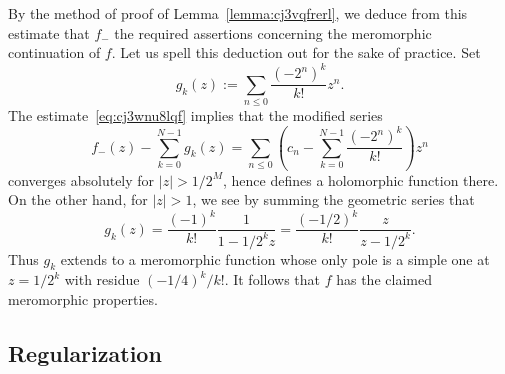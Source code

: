 \documentclass[reqno]{amsart}  \numberwithin{theorem}{section} \numberwithin{equation}{section}
\begin{document}
\begin{example}
\begin{equation}
  \end{equation}
  By the method of proof of Lemma~\ref{lemma:cj3vqfrerl}, we deduce from this estimate that $f_-$ the required assertions concerning the meromorphic continuation of $f$.  Let us spell this deduction out for the sake of practice.  Set
  \begin{equation*}
    g_k(z) := 
    \sum_{n \leq 0}
    \frac{{(-2^n)}^k}{k!} z^n.
  \end{equation*}
  The estimate~\eqref{eq:cj3wnu8lqf} implies that the modified series
  \begin{equation}\label{eq:cj3wnu7518}
    f_-(z)
    -
    \sum_{k = 0}^{N-1}
    g_k(z)
    = 
    \sum_{n \leq 0}
    \left( c_n -
      \sum_{k = 0}^{N-1} \frac{{(-2^n)}^k}{k!}
    \right) z^n
  \end{equation}
  converges absolutely for $\lvert z \rvert > 1 / 2^M$, hence defines a holomorphic function there.  On the other hand, for $\lvert z \rvert > 1$, we see by summing the geometric series that
  \begin{equation*}
    g_k(z)
    =
    \frac{{(-1)}^k}{k!}
    \frac{1}{1 - 1 / 2^k z}
    =
    \frac{{(-1/2)}^k}{k!}
    \frac{z}{z - 1 / 2^k}.
  \end{equation*}
  Thus $g_k$ extends to a meromorphic function whose only pole is a simple one at $z = 1/2^k$ with residue ${(-1/4)}^k / k!$.  It follows that $f$ has the claimed meromorphic properties.
\end{example}

\subsection{Regularization}
\end{document}
